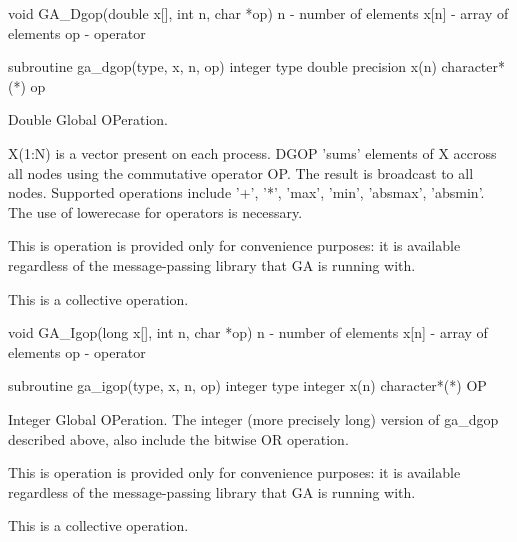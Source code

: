 \documentclass[12pt]{article}
\begin{document}

\begin{capi}
void GA_Dgop(double x[], int n, char *op)
   n     - number of elements       \access{[input]} 
   x[n]  - array of elements         
   op    - operator                 \access{[input]} 
\end{capi}
\begin{fapi}
subroutine ga_dgop(type, x, n, op)
   integer type              \access{[input]} 
   double precision x(n)      
   character*(*) op          \access{[input]} 
\end{fapi}

\begin{desc}

Double Global OPeration.

X(1:N) is a vector present on each process. DGOP 'sums' elements of X accross all nodes using the commutative operator OP. The result is broadcast to all nodes. Supported operations include '+', '*', 'max', 'min', 'absmax', 'absmin'. The use of lowerecase for operators is necessary.

This is operation is provided only for convenience purposes: it is available regardless of the message-passing library that GA is running with.

This is a collective operation.
\end{desc}


\begin{capi}
void GA_Igop(long x[], int n, char *op)
   n     - number of elements       \access{[input]} 
   x[n]  - array of elements         
   op    - operator                 \access{[input]} 
\end{capi}
\begin{fapi}
subroutine ga_igop(type, x, n, op)
   integer type               \access{[input]} 
   integer x(n)                
   character*(*) OP           \access{[input]} 
\end{fapi}

\begin{desc}

Integer Global OPeration. The integer (more precisely long) version of ga_dgop described above, also include the bitwise OR operation.

This is operation is provided only for convenience purposes: it is available regardless of the message-passing library that GA is running with.

This is a collective operation.
\end{desc}
\end{document}
